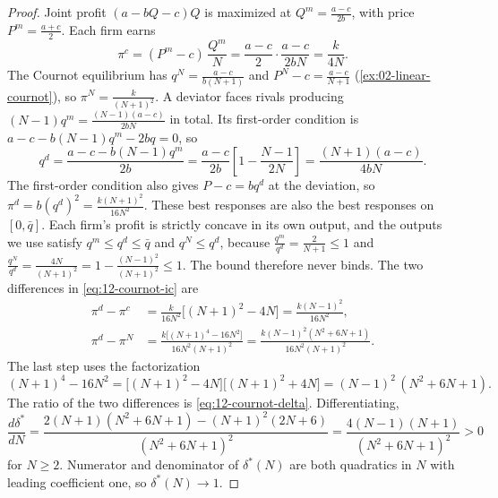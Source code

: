 \begin{proof}
Joint profit $(a - bQ - c)Q$ is maximized at $Q^m = \frac{a - c}{2b}$, with price $P^m = \frac{a + c}{2}$. Each firm
earns
\begin{equation*}
\pi^c = (P^m - c)\,\frac{Q^m}{N} = \frac{a - c}{2}\cdot\frac{a - c}{2bN} = \frac{k}{4N} .
\end{equation*}
The Cournot equilibrium has $q^N = \frac{a - c}{b(N + 1)}$ and $P^N - c = \frac{a - c}{N + 1}$
(\cref{ex:02-linear-cournot}), so $\pi^N = \frac{k}{(N + 1)^2}$. A deviator faces rivals producing
$(N - 1)q^m = \frac{(N - 1)(a - c)}{2bN}$ in total. Its first-order condition is
$a - c - b(N - 1)q^m - 2bq = 0$, so
\begin{equation*}
q^d = \frac{a - c - b(N - 1)q^m}{2b} = \frac{a - c}{2b}\left[1 - \frac{N - 1}{2N}\right] = \frac{(N + 1)(a - c)}{4bN} .
\end{equation*}
The first-order condition also gives $P - c = bq^d$ at the deviation, so $\pi^d = b(q^d)^2 = \frac{k(N + 1)^2}{16N^2}$.
These best responses are also the best responses on $[0, \bar q]$. Each firm's profit is strictly concave in its own
output, and the outputs we use satisfy $q^m \le q^d \le \bar q$ and $q^N \le q^d$, because
$\frac{q^m}{q^d} = \frac{2}{N + 1} \le 1$ and $\frac{q^N}{q^d} = \frac{4N}{(N + 1)^2} = 1 - \frac{(N - 1)^2}{(N + 1)^2}
\le 1$. The bound therefore never binds. The two differences in \eqref{eq:12-cournot-ic} are
\begin{align*}
\pi^d - \pi^c &= \frac{k}{16N^2}\bigl[(N + 1)^2 - 4N\bigr] = \frac{k(N - 1)^2}{16N^2} , \\
\pi^d - \pi^N &= \frac{k\bigl[(N + 1)^4 - 16N^2\bigr]}{16N^2(N + 1)^2}
= \frac{k(N - 1)^2(N^2 + 6N + 1)}{16N^2(N + 1)^2} .
\end{align*}
The last step uses the factorization
\begin{equation*}
(N + 1)^4 - 16N^2 = \bigl[(N + 1)^2 - 4N\bigr]\bigl[(N + 1)^2 + 4N\bigr] = (N - 1)^2\,(N^2 + 6N + 1) .
\end{equation*}
The ratio of the two differences is \eqref{eq:12-cournot-delta}. Differentiating,
\begin{equation*}
\frac{d\delta^*}{dN} = \frac{2(N + 1)(N^2 + 6N + 1) - (N + 1)^2(2N + 6)}{(N^2 + 6N + 1)^2}
= \frac{4(N - 1)(N + 1)}{(N^2 + 6N + 1)^2} > 0
\end{equation*}
for $N \ge 2$. Numerator and denominator of $\delta^*(N)$ are both quadratics in $N$ with leading coefficient one, so
$\delta^*(N) \to 1$.
\end{proof}

